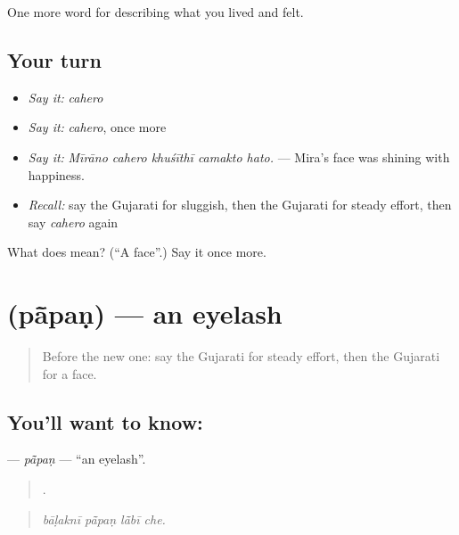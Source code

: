 \begin{grammarlens}[title={What you've built}]
One more word for describing what you lived and felt.
\end{grammarlens}

\subsection*{Your turn}
\begin{itemize}
\raggedright
  \item \emph{Say it:} \emph{cahero}
  \item \emph{Say it:} \emph{cahero}, once more
  \item \emph{Say it:} \emph{Mīrāno cahero khuśīthī camakto hato.} — Mira's face was shining with happiness.
  \item \emph{Recall:} say the Gujarati for sluggish, then the Gujarati for steady effort, then say \emph{cahero} again
\end{itemize}

\begin{tcolorbox}[breakable,colback=teal!4,colframe=teal!35!black,title={Before you move on}]
What does  mean? (\textquotedblleft{}A face\textquotedblright{}.) Say it once more.
\end{tcolorbox}
\section[\texorpdfstring{\gu{પાંપણ} (pā̃paṇ)}{પાંપણ (pā̃paṇ)}]{ (pā̃paṇ) — an eyelash}

\label{lesson:GU-C470-papan}



\begin{quote}
Before the new one: say the Gujarati for steady effort, then the Gujarati for a face.
\end{quote}

\subsection*{You'll want to know: }
\textbf{} — \emph{pā̃paṇ} — \textquotedblleft{}an eyelash\textquotedblright{}.

\begin{quote}
   .
\end{quote}

\begin{quote}
\emph{bāḷaknī pā̃paṇ lā̃bī che.}
\end{quote}

